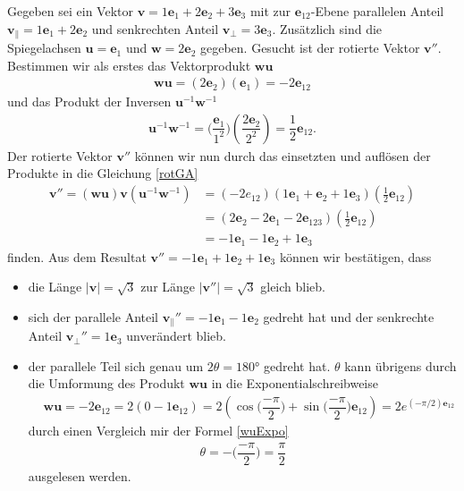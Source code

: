 \begin{beispiel} 
	Gegeben sei ein Vektor $\mathbf{v} = 1\mathbf{e}_1 + 2\mathbf{e}_2 + 3\mathbf{e}_3$ mit zur $\mathbf{e}_{12}$-Ebene parallelen Anteil $\mathbf{v_\parallel} = 1\mathbf{e}_1 + 2\mathbf{e}_2$ und senkrechten Anteil $\mathbf{v_\perp} = 3\mathbf{e}_3$. Zusätzlich sind die Spiegelachsen $\mathbf{u} = \mathbf{e}_1$ und $\mathbf{w} = 2\mathbf{e}_2$ gegeben. Gesucht ist der rotierte Vektor $\mathbf{v}''$. Bestimmen wir als erstes das Vektorprodukt $\mathbf{wu}$
	\begin{align}
		\mathbf{wu} = (2\mathbf{e}_2)(\mathbf{e}_1) = -2\mathbf{e}_{12}
	\end{align}
	und das Produkt der Inversen $\mathbf{u}^{-1}\mathbf{w}^{-1}$
	\begin{align}
		\mathbf{u}^{-1}\mathbf{w}^{-1} = \biggl(\dfrac{\mathbf{e}_1}{1^2}\biggr) \left(\dfrac{2\mathbf{e}_2}{2^2}\right) = \dfrac{1}{2}\mathbf{e}_{12}.
	\end{align}
	Der rotierte Vektor $\mathbf{v}''$ können wir nun durch das einsetzten und auflösen der Produkte in die Gleichung \eqref{rotGA}
	\begin{align}
		\mathbf{v}'' = (\mathbf{wu})\mathbf{v}(\mathbf{u}^{-1}\mathbf{w}^{-1}) &= (-2e_{12})(1\mathbf{e}_1 + \mathbf{e}_2 + 1\mathbf{e}_3)(\textstyle{\frac{1}{2}}\mathbf{e}_{12})\\
		&= (2\mathbf{e}_2-2\mathbf{e}_1-2\mathbf{e}_{123})(\textstyle{\frac{1}{2}}\mathbf{e}_{12})\\
		&= -1\mathbf{e}_1 - 1\mathbf{e}_2 + 1\mathbf{e}_3
	\end{align}
	finden. Aus dem Resultat $\mathbf{v}''= -1\mathbf{e}_1 + 1\mathbf{e}_2 + 1\mathbf{e}_3$ können wir bestätigen, dass
	\begin{itemize}
		\item die Länge $|\mathbf{v}| = \sqrt{3}$ zur Länge $|\mathbf{v}''|=\sqrt{3}$ gleich blieb.
		\item sich der parallele Anteil $\mathbf{v_\parallel}'' = -1\mathbf{e}_1 - 1\mathbf{e}_2$ gedreht hat und der senkrechte Anteil $\mathbf{v_\perp}'' = 1\mathbf{e}_3$ unverändert blieb.
		\item der parallele Teil sich genau um $2\theta=180$° gedreht hat. $\theta$ kann übrigens durch die Umformung des Produkt $\mathbf{wu}$ in die Exponentialschreibweise
		\begin{align}
			&\mathbf{wu} = -2\mathbf{e}_{12} = 2(0-1\mathbf{e}_{12})=2(\cos\biggl(\dfrac{-\pi}{2}\biggr) + \sin\biggl(\dfrac{-\pi}{2}\biggr)\mathbf{e}_{12}) = 2e^{(-\pi/2)\mathbf{e}_{12}}
		\end{align}
		durch einen Vergleich mir der Formel \eqref{wuExpo}
		\begin{align}
			\theta = -\biggl(\dfrac{-\pi}{2}\biggr) = \dfrac{\pi}{2}
		\end{align}
		ausgelesen werden.
	\end{itemize}
\end{beispiel}